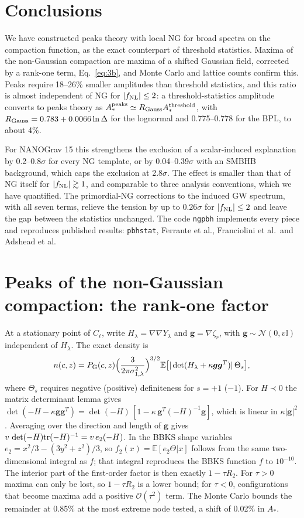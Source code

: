 \documentclass{article}
\newcommand{\Cl}{C_{\ell}}
\newcommand{\zr}{\zeta_r}
\newcommand{\E}{\mathbb{E}}
\newcommand{\fnl}{f_{\rm NL}}
\begin{document}
\section{Conclusions}\label{sec:concl}

We have constructed peaks theory with local NG for broad spectra on the compaction function, as
the exact counterpart of threshold statistics. Maxima of the non-Gaussian compaction are maxima of
a shifted Gaussian field, corrected by a rank-one term, Eq.~\eqref{eq:3b}, and Monte Carlo and
lattice counts confirm this. Peaks require 18--26\% smaller amplitudes than threshold statistics,
and this ratio is almost independent of NG for $|\fnl|\le2$: a threshold-statistics amplitude
converts to peaks theory as $A_*^{\rm peaks}\simeq R_{\rm Gauss}A_*^{\rm threshold}$, with
$R_{\rm Gauss}=0.783+0.0066\ln\Delta$ for the lognormal and 0.775--0.778 for the BPL, to about 4\%.

For NANOGrav 15 this strengthens the exclusion of a scalar-induced explanation by
0.2--0.8$\sigma$ for every NG template, or by 0.04--0.39$\sigma$ with an SMBHB background, which
caps the exclusion at 2.8$\sigma$. The effect is smaller than that of NG itself for
$|\fnl|\gtrsim1$, and comparable to three analysis conventions, which we have quantified. The
primordial-NG corrections to the induced GW spectrum, with all seven terms, relieve the tension by
up to $0.26\sigma$ for $|\fnl|\le2$ and leave the gap between the statistics unchanged. The code
\texttt{ngpbh} implements every piece and reproduces published results: \texttt{pbhstat}, Ferrante
et al., Franciolini et al.\ and Adshead et al.

\appendix

\section{Peaks of the non-Gaussian compaction: the rank-one factor}\label{app:3b}

At a stationary point of $\Cl$, write $H_\lambda=\nabla\nabla Y_\lambda$ and $\bm g=\nabla\zr$,
with $\bm g\sim\mathcal N(0,v\mathbb I)$ independent of $H_\lambda$. The exact density is
\begin{equation}
n(c,z)=P_{\rm G}(c,z)\Big(\frac{3}{2\pi\sigma^2_{1,\lambda}}\Big)^{3/2}
\E\big[|\det(H_\lambda+\kappa\bm g\bm g^T)|\,\Theta_s\big],
\end{equation}
where $\Theta_s$ requires negative (positive) definiteness for $s=+1$ ($-1$). For $H\prec0$ the
matrix determinant lemma gives
$\det(-H-\kappa\bm g\bm g^T)=\det(-H)\,[1-\kappa\,\bm g^T(-H)^{-1}\bm g]$, which is linear in
$\kappa|\bm g|^2$. Averaging over the direction and length of $\bm g$ gives
$v\,\det(-H){\rm tr}(-H)^{-1}=v\,e_2(-H)$. In the BBKS shape variables $e_2=x^2/3-(3y^2+z^2)/3$,
so $f_2(x)=\E[e_2\Theta|x]$ follows from the same two-dimensional integral as $f$; that integral
reproduces the BBKS function $f$ to $10^{-10}$. The interior part of the first-order factor is
then exactly $1-\tau R_2$. For $\tau>0$ maxima can only be lost, so $1-\tau R_2$ is a lower bound;
for $\tau<0$, configurations that become maxima add a positive $\mathcal O(\tau^2)$ term. The
Monte Carlo bounds the remainder at 0.85\% at the most extreme node tested, a shift of 0.02\% in
$A_*$.
\end{document}
